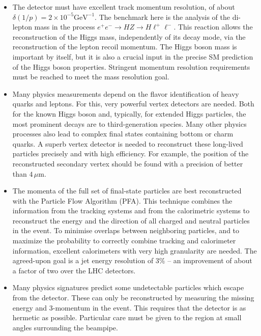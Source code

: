 \documentclass[%
reprint,
 floatfix,
 amsmath,amssymb,
 aps,
]{revtex4-1}
\def\ee{e^+e^-}
\begin{document}
 
\begin{itemize}
 \item The detector must have excellent track momentum
   resolution, of about $\delta(1/p)=2 \times 10^{-5} \mathrm{GeV}^{-1}$. 
The benchmark  here is the analysis 
of the di-lepton mass in the process $\ee \to HZ \to H \ell^+
\ell^-$. This reaction allows the reconstruction of the 
Higgs mass,  independently of its decay mode,  via the 
reconstruction of the lepton recoil momentum. The Higgs boson mass is
important by itself, but it is also a crucial input in the precise SM
prediction of the Higgs boson properties.  Stringent momentum resolution requirements must be reached
to meet the mass resolution goal. 
\item Many physics measurements depend on the flavor  identification of heavy
  quarks
and leptons.  For this, very powerful vertex detectors 
are needed. Both for the known Higgs boson and, typically, for 
extended Higgs particles, the most prominent decays are to
third-generation
species.   Many other physics processes also lead to 
complex  final states containing  bottom or charm quarks.
A superb  vertex detector  is needed to reconstruct these 
long-lived particles 
precisely and with high efficiency.
 For example, the position of the reconstructed secondary
 vertex
 should be found with a precision of better than $4\,\mu$m.
\item The momenta of the full set of final-state particles are
 best reconstructed with the 
Particle Flow Algorithm (PFA).
 This  technique combines 
the information from the tracking systems and from the 
calorimetric systems to reconstruct the 
energy and the direction of all charged and 
neutral particles in the event. To minimise overlaps between 
neighboring particles, and to 
maximize the probability to 
correctly combine tracking and calorimeter information, 
excellent calorimeters with very high granularity  are needed.
The agreed-upon goal is  a jet energy resolution of $3 \%$ -- an
improvement of about a 
factor of two over the LHC detectors. 
\item Many physics signatures predict some undetectable particles
which escape from the detector. These  can only be reconstructed by 
measuring the missing energy and 3-momentum  in the event. This requires 
that the detector is as hermetic as possible. 
Particular care must be given to the region at small angles surrounding the 
beampipe. %
\end{itemize}
\end{document}
